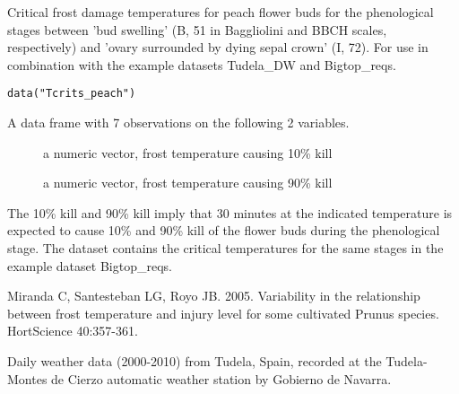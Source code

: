 \documentclass[a4paper]{book}
\begin{document}
%
\begin{Description}\relax
Critical frost damage temperatures for peach flower buds for the phenological
stages between 'bud swelling' (B, 51 in Baggliolini and BBCH scales, 
respectively) and 'ovary surrounded by dying sepal crown' (I, 72). For use in 
combination with the example datasets Tudela\_DW and Bigtop\_reqs.
\end{Description}
%
\begin{Usage}
\begin{verbatim}
data("Tcrits_peach")
\end{verbatim}
\end{Usage}
%
\begin{Format}
A data frame with 7 observations on the following 2 variables.
\begin{description}

\item[] a numeric vector, frost temperature causing 10\% kill
\item[] a numeric vector, frost temperature causing 90\% kill

\end{description}

\end{Format}
%
\begin{Details}\relax
The 10\% kill and 90\% kill imply that 30 minutes at the indicated temperature
is expected to cause 10\% and 90\% kill of the flower buds during the phenological
stage. The dataset contains the critical temperatures for the same stages in the
example dataset Bigtop\_reqs. 
\end{Details}
%
\begin{Source}\relax
Miranda C, Santesteban LG, Royo JB. 2005. Variability in the relationship between
frost temperature and injury level for some cultivated Prunus species. HortScience
40:357-361.
\end{Source}
%
\begin{Description}\relax
Daily weather data (2000-2010) from Tudela, Spain, recorded at the Tudela-Montes de Cierzo
automatic weather station by Gobierno de Navarra.
\end{Description}
%
\end{document}
